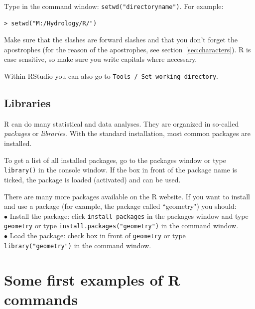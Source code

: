 \documentclass[a4paper,11pt,twocolumn,tablecaptionabove]{scrartcl}
\begin{document}
Type in the command window: \verb!setwd("directoryname")!.  For example:
\begin{Verbatim}[frame=single,gobble=0]
> setwd("M:/Hydrology/R/")
\end{Verbatim}
Make sure that the slashes are forward slashes and that you don't forget the apostrophes (for the reason of the apostrophes, see section~\ref{sec:characters}). R is case sensitive, so make sure you write capitals where necessary.

Within RStudio you can also go to \texttt{Tools / Set working directory}.

\subsection{Libraries} 

R can do many statistical and data analyses. 
They are organized in so-called \emph{packages} or \emph{libraries}. 
With the standard installation, most common packages are installed.  

To get a list of all installed packages, go to the packages window or type \verb!library()! in the console window. 
If the box in front of the package name is ticked, the package is loaded (activated) and can be used. 

There are many more packages available on the R website.
If you want to install and use a package (for example, the package called ``geometry") you should:\\
\noindent $\bullet$ Install the package:  click \texttt{install packages} in the packages window and type \texttt{geometry} or type \verb!install.packages("geometry")! in the command window.\\
\noindent $\bullet$ Load the package: check box in front of \texttt{geometry} or type \verb!library("geometry")! in the command window. 


\section{Some first examples of R commands}

\end{document}
